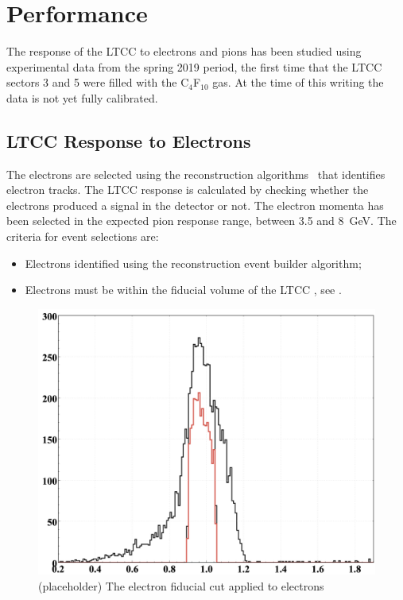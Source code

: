 \section{Performance}

The response of the LTCC to electrons and pions has been studied using experimental data from the spring 2019 period,
the first time that the LTCC sectors 3 and 5 were filled with the C$_4$F$_{10}$ gas.
At the time of this writing the data is not yet fully calibrated.

\subsection{LTCC Response to Electrons}\label{sec:elecResponse}

The electrons are selected using the reconstruction algorithms~\cite{recon-nim} that identifies electron tracks.
The LTCC response is calculated by checking whether the electrons produced a signal in the detector or not.
The electron momenta has been selected in the expected pion response range, between 3.5 and 8~GeV.
The criteria for event selections are:

\begin{itemize}
   \item  Electrons identified using the reconstruction event builder algorithm;
    \item Electrons must be within the fiducial volume of the LTCC , see .
\end{itemize}

\begin{figure}
	\centering
	\includegraphics[width=0.98\columnwidth,keepaspectratio]{img/electronDetFiducialCut.png}
	\caption{(placeholder) The electron fiducial cut applied to electrons}
	\label{fig:electronDetFiducialCut}
\end{figure}

